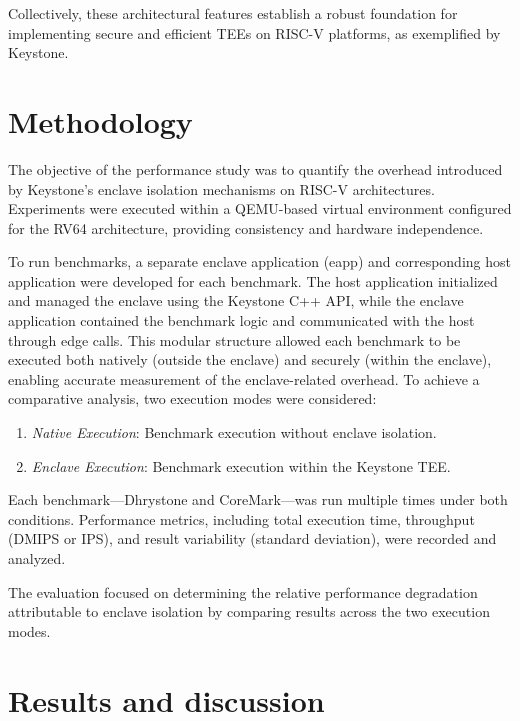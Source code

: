 \documentclass[english, version-2020-11]{uzl-thesis}
\begin{document}
Collectively, these architectural features establish a robust foundation for implementing secure and efficient TEEs on RISC-V platforms, as exemplified by Keystone.



\chapter{Methodology}
The objective of the performance study was to quantify the overhead introduced by Keystone's enclave isolation mechanisms on RISC-V architectures. Experiments were executed within a QEMU-based virtual environment configured for the RV64 architecture, providing consistency and hardware independence.

To run benchmarks, a separate enclave application (eapp) and corresponding host application were developed for each benchmark. The host application initialized and managed the enclave using the Keystone C++ API, while the enclave application contained the benchmark logic and communicated with the host through edge calls. This modular structure allowed each benchmark to be executed both natively (outside the enclave) and securely (within the enclave), enabling accurate measurement of the enclave-related overhead.
To achieve a comparative analysis, two execution modes were considered:
\begin{enumerate}
\item \textit{Native Execution}: Benchmark execution without enclave isolation.
\item \textit{Enclave Execution}: Benchmark execution within the Keystone TEE.
\end{enumerate}

Each benchmark—Dhrystone and CoreMark—was run multiple times under both conditions. Performance metrics, including total execution time, throughput (DMIPS or IPS), and result variability (standard deviation), were recorded and analyzed.

The evaluation focused on determining the relative performance degradation attributable to enclave isolation by comparing results across the two execution modes.



\chapter{Results and discussion}

\end{document}
